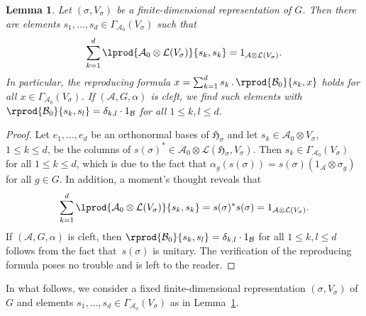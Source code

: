 \documentclass[10pt,a4paper]{amsart}
\numberwithin{equation}{section}
\newtheorem{Lemma}[Theorem]{Lemma}
\newcommand*{\tensor}{\otimes}		%
\newcommand*{\acts}{\,.\,}
\newcommand*{\hilb}{\mathfrak}		%
\newcommand*{\alg}{\mathcal}		%
\newcommand*{\hH}{\hilb{H}}			%
\newcommand*{\one}{1}				%
\newcommand*{\aA}{\alg{A}}			%
\newcommand*{\aB}{\alg{B}} 			%
\newcommand*{\End}{\mathcal{L}} %
\begin{document}
\begin{Lemma}\label{lem:partition}
	Let $(\sigma,V_\sigma)$ be a finite-dimensional representation of $G$.
	Then there are elements $s_1, \dots, s_d \in \Gamma_{\aA_0}(V_\sigma)$ such that
	\begin{gather*}
		\sum_{k=1}^d \lprod{\aA_0 \tensor \End(V_\sigma)}{s_k,s_k}= \one_{\aA \tensor \End(V_\sigma)}.
	\end{gather*}
	In particular, the reproducing formula $x = \sum_{k=1}^d s_k \acts \rprod{\aB_0}{s_k,x}$ holds for all $x \in \Gamma_{\aA_0}(V_\sigma)$.
	If $(\aA, G, \alpha)$ is cleft, we find such elements with $\rprod{\aB_0}{s_k,s_l} = \delta_{k,l} \cdot \one_\aB$ for all $1\leq k,l \leq d$.
\end{Lemma}
\begin{proof}
	Let $e_1,\dots,e_d$ be an orthonormal bases of $\hH_\sigma$ and let $s_k \in \aA_0 \tensor V_\sigma$, $1 \leq k \leq d$, be the columns of $s(\sigma)^* \in \aA_0 \tensor \End(\hH_\sigma,V_\sigma) $.
	Then $s_k \in \Gamma_{\aA_0}(V_\sigma)$ for all $1 \leq k \leq d$, which is due to the fact that $\alpha_g(s(\sigma)) = s(\sigma) (\one_\aA \tensor \sigma_g)$ for all $g \in G$.
	In addition, a moment's thought reveals that
	\begin{align*}
		\sum_{k=1}^d \lprod{\aA_0 \tensor \End(V_\sigma)}{s_k,s_k} = s(\sigma)^* s(\sigma) = \one_{\aA \tensor \End(V_\sigma)}.
	\end{align*}
	If $(\aA, G, \alpha)$ is cleft, then $\rprod{\aB_0}{s_k,s_l} = \delta_{k,l} \cdot \one_\aB$ for all $1\leq k,l \leq d$ follows from the fact that~$s(\sigma)$ is unitary. The verification of the reproducing formula poses no trouble and is left to the reader.
\end{proof}

In what follows, we consider a fixed finite-dimensional representation $(\sigma,V_\sigma)$ of $G$ and elements $s_1, \dots, s_d \in \Gamma_{\aA_0}(V_\sigma)$ as in Lemma~\ref{lem:partition}.
\end{document}
